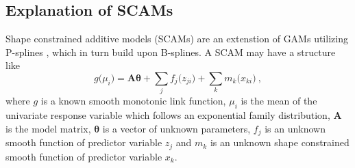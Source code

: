 \subsection{Explanation of SCAMs}

Shape constrained additive models (SCAMs) \parencite{Pya2010,Pya2015} are an extenstion of GAMs utilizing P-splines \parencite{Eilers1996}, which in turn build upon B-splines.  A SCAM may have a structure like
\begin{equation}
  \label{eq:SCAM}
  g\bigl(\mu_i\bigr) = \symbf{A} \symbf{\theta} + \sum_j f_j\bigl(z_{j i}\bigr) + \sum_k m_k\bigl(x_{k i}\bigr)~,
\end{equation}
where \(g\) is a known smooth monotonic link function, \(\mu_i\) is the mean of the univariate response variable which follows an exponential family distribution, \(\symbf{A}\) is the model matrix, \(\symbf{\theta}\) is a vector of unknown parameters, \(f_j\) is an unknown smooth function of predictor variable \(z_j\) and \(m_k\) is an unknown shape constrained smooth function of predictor variable \(x_k\).

